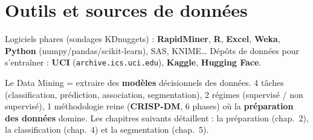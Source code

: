 \section{Outils et sources de données}
Logiciels phares (sondages KDnuggets) : \textbf{RapidMiner}, \textbf{R}, \textbf{Excel},
\textbf{Weka}, \textbf{Python} (numpy/pandas/scikit-learn), SAS, KNIME… Dépôts de données
pour s'entraîner : \textbf{UCI} (\texttt{archive.ics.uci.edu}), \textbf{Kaggle},
\textbf{Hugging Face}.

\begin{Resume}
Le Data Mining = extraire des \textbf{modèles} décisionnels des données. 4 tâches
(classification, prédiction, association, segmentation), 2 régimes (supervisé / non
supervisé), 1 méthodologie reine (\textbf{CRISP-DM}, 6 phases) où la \textbf{préparation des
données} domine. Les chapitres suivants détaillent : la préparation (chap.~2), la
classification (chap.~4) et la segmentation (chap.~5).
\end{Resume}
